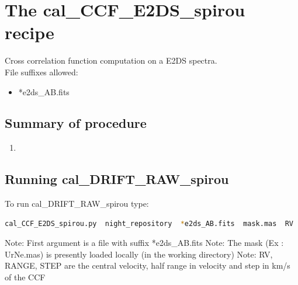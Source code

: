 \clearpage
\newpage
\section{The cal\_CCF\_E2DS\_spirou recipe}
\label{section:cal_CCF_E2DS_spirou}

Cross correlation function computation on a E2DS spectra. \\


\noindent File suffixes allowed:
\begin{itemize}
	\item *e2ds\_AB.fits
\end{itemize}

\subsection{Summary of procedure}
\begin{enumerate}
	\item 
\end{enumerate}

\subsection{Running cal\_DRIFT\_RAW\_spirou}

To run cal\_DRIFT\_RAW\_spirou type:
\begin{lstlisting}[language=bash, style=bashstyle]
cal_CCF_E2DS_spirou.py  night_repository  *e2ds_AB.fits  mask.mas  RV  RANGE  STEP 
\end{lstlisting}

\noindent Note: First argument is a file with suffix *e2ds\_AB.fits
\noindent Note: The mask (Ex : UrNe.mas) is presently loaded locally (in the working directory) 
\noindent Note: RV, RANGE, STEP are the central velocity, half range in velocity and step in km/s of the CCF 




